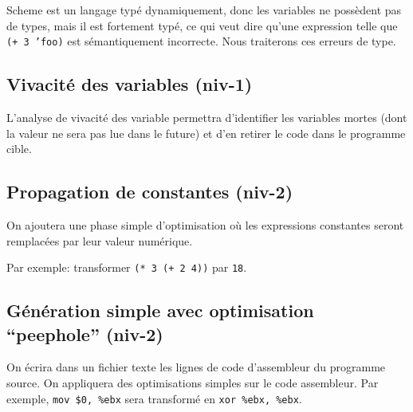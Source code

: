 \documentclass[11pt]{article}
\begin{document}
Scheme est un langage typé dynamiquement, donc les variables ne
possèdent pas de types, mais il est fortement typé, ce qui veut dire
qu'une expression telle que \texttt{(+ 3 'foo)} est sémantiquement
incorrecte.  Nous traiterons ces erreurs de type.

\subsection{Vivacité des variables (niv-1)}

L'analyse de vivacité des variable permettra d'identifier les
variables mortes (dont la valeur ne sera pas lue dans le future) et
d'en retirer le code dans le programme cible.


\subsection{Propagation de constantes (niv-2)}

On ajoutera une phase simple d'optimisation où les expressions
constantes seront remplacées par leur valeur numérique.

Par exemple: transformer \texttt{(* 3 (+ 2 4))} par \texttt{18}.


\subsection{Génération simple avec optimisation ``peephole'' (niv-2)}

On écrira dans un fichier texte les lignes de code d'assembleur du
programme source.  On appliquera des optimisations simples sur le code
assembleur.  Par exemple, \texttt{mov \$0, \%ebx} sera transformé en
\texttt{xor \%ebx, \%ebx}.
\end{document}
